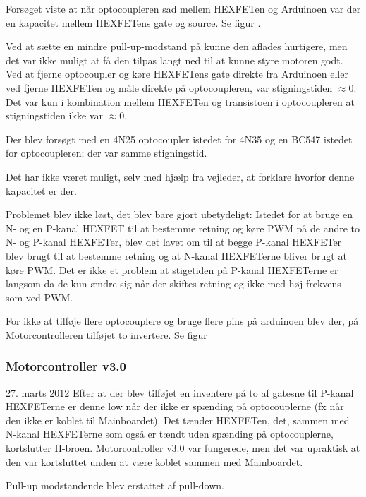 \documentclass[a4paper,oneside,article,danish,table,draft]{memoir}
\newcommand{\boarddate}[1]{\textcolor{blue!80!black}{#1}}
\begin{document}

Forsøget viste at når optocoupleren sad mellem HEXFETen og Arduinoen var der en kapacitet mellem HEXFETens gate og source. Se figur .

Ved at sætte en mindre pull-up-modstand på kunne den aflades hurtigere, men det var ikke muligt at få den tilpas langt ned til at kunne styre motoren godt. Ved at fjerne optocoupler og køre HEXFETens gate direkte fra Arduinoen eller ved fjerne HEXFETen og måle direkte på optocoupleren, var stigningstiden $\approx0$. Det var kun i kombination mellem HEXFETen og transistoen i optocoupleren at stigningstiden ikke var $\approx0$.

Der blev forsøgt med en 4N25 optocoupler istedet for 4N35 og en BC547 istedet for optocoupleren; der var samme stigningstid.

Det har ikke været muligt, selv med hjælp fra vejleder, at forklare hvorfor denne kapacitet er der.

Problemet blev ikke løst, det blev bare gjort ubetydeligt: Istedet for at bruge en N- og en P-kanal HEXFET til at bestemme retning og køre PWM på de andre to N- og P-kanal HEXFETer, blev det lavet om til at begge P-kanal HEXFETer blev brugt til at bestemme retning og at N-kanal HEXFETerne bliver brugt at køre PWM. Det er ikke et problem at stigetiden på P-kanal HEXFETerne er langsom da de kun ændre sig når der skiftes retning og ikke med høj frekvens som ved PWM.

For ikke at tilføje flere optocouplere og bruge flere pins på arduinoen blev der, på Motorcontrolleren tilføjet to invertere. Se figur 
\subsubsection{Motorcontroller v3.0}
\boarddate{27. marts 2012}
Efter at der blev tilføjet en inventere på to af gatesne til P-kanal HEXFETerne er denne low når der ikke er spænding på optocouplerne (fx når den ikke er koblet til Mainboardet). Det tænder HEXFETen, det, sammen med N-kanal HEXFETerne som også er tændt uden spænding på optocouplerne, kortslutter H-broen. Motorcontroller v3.0 var fungerede, men det var upraktisk at den var kortsluttet unden at være koblet sammen med Mainboardet.

Pull-up modstandende blev erstattet af pull-down.
\end{document}
